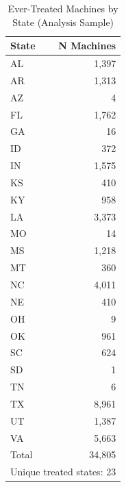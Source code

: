 \begin{table}[h!]
\centering
\caption{Ever-Treated Machines by State (Analysis Sample)}
\label{tab:treated_states}
\begin{tabular}{lr}
\toprule
State & N Machines \\
\midrule
AL & 1,397 \\
AR & 1,313 \\
AZ & 4 \\
FL & 1,762 \\
GA & 16 \\
ID & 372 \\
IN & 1,575 \\
KS & 410 \\
KY & 958 \\
LA & 3,373 \\
MO & 14 \\
MS & 1,218 \\
MT & 360 \\
NC & 4,011 \\
NE & 410 \\
OH & 9 \\
OK & 961 \\
SC & 624 \\
SD & 1 \\
TN & 6 \\
TX & 8,961 \\
UT & 1,387 \\
VA & 5,663 \\
\midrule
Total & 34,805 \\
\midrule
\multicolumn{2}{l}{Unique treated states: 23} \\
\bottomrule
\end{tabular}
\end{table}
